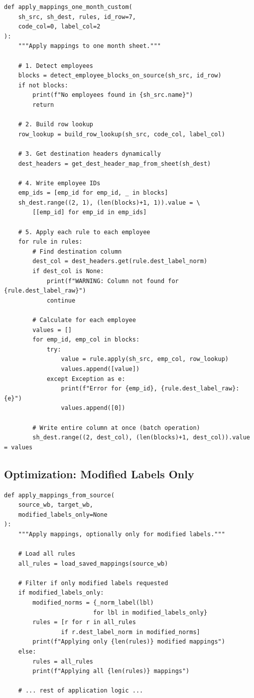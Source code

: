 \begin{lstlisting}[style=pythonstyle]
def apply_mappings_one_month_custom(
    sh_src, sh_dest, rules, id_row=7, 
    code_col=0, label_col=2
):
    """Apply mappings to one month sheet."""
    
    # 1. Detect employees
    blocks = detect_employee_blocks_on_source(sh_src, id_row)
    if not blocks:
        print(f"No employees found in {sh_src.name}")
        return
    
    # 2. Build row lookup
    row_lookup = build_row_lookup(sh_src, code_col, label_col)
    
    # 3. Get destination headers dynamically
    dest_headers = get_dest_header_map_from_sheet(sh_dest)
    
    # 4. Write employee IDs
    emp_ids = [emp_id for emp_id, _ in blocks]
    sh_dest.range((2, 1), (len(blocks)+1, 1)).value = \
        [[emp_id] for emp_id in emp_ids]
    
    # 5. Apply each rule to each employee
    for rule in rules:
        # Find destination column
        dest_col = dest_headers.get(rule.dest_label_norm)
        if dest_col is None:
            print(f"WARNING: Column not found for {rule.dest_label_raw}")
            continue
        
        # Calculate for each employee
        values = []
        for emp_id, emp_col in blocks:
            try:
                value = rule.apply(sh_src, emp_col, row_lookup)
                values.append([value])
            except Exception as e:
                print(f"Error for {emp_id}, {rule.dest_label_raw}: {e}")
                values.append([0])
        
        # Write entire column at once (batch operation)
        sh_dest.range((2, dest_col), (len(blocks)+1, dest_col)).value = values
\end{lstlisting}

\subsection{Optimization: Modified Labels Only}

\begin{lstlisting}[style=pythonstyle]
def apply_mappings_from_source(
    source_wb, target_wb, 
    modified_labels_only=None
):
    """Apply mappings, optionally only for modified labels."""
    
    # Load all rules
    all_rules = load_saved_mappings(source_wb)
    
    # Filter if only modified labels requested
    if modified_labels_only:
        modified_norms = {_norm_label(lbl) 
                         for lbl in modified_labels_only}
        rules = [r for r in all_rules 
                if r.dest_label_norm in modified_norms]
        print(f"Applying only {len(rules)} modified mappings")
    else:
        rules = all_rules
        print(f"Applying all {len(rules)} mappings")
    
    # ... rest of application logic ...
\end{lstlisting}

